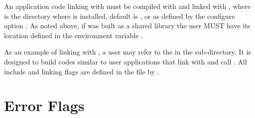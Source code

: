 An application code linking with \hypre{} must be compiled with
 and linked with , where
 is the directory where \hypre{} is installed, default is
, or as defined by the configure option . As
noted above, if \hypre{} was built as a shared library the user MUST have its
location defined in the environment variable .

As an example of linking with \hypre{}, a user may refer to the 
in the  sub-directory.  It is designed to build codes similar to
user applications that link with and call \hypre{}.  All include and linking
flags are defined in the  file by .


\section{Error Flags}

